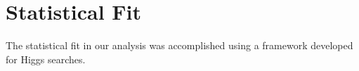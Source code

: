 \chapter{Statistical Fit} \label{chap:fit}

The statistical fit in our analysis was accomplished using a framework developed
for Higgs searches.




